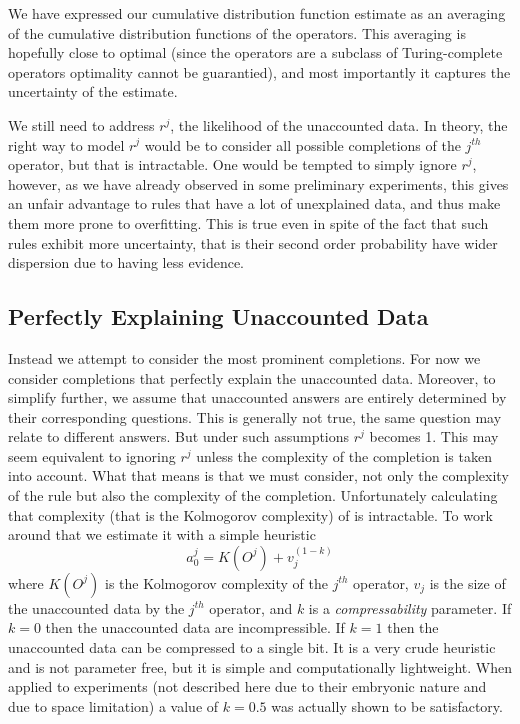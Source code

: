 \documentclass[runningheads]{llncs}
\begin{document}
We have expressed our cumulative distribution function estimate as an
averaging of the cumulative distribution functions of the
operators. This averaging is hopefully close to optimal (since the
operators are a subclass of Turing-complete operators optimality
cannot be guarantied), and most importantly it captures the
uncertainty of the estimate.

We still need to address $r^j$, the likelihood of the unaccounted
data. In theory, the right way to model $r^j$ would be to consider all
possible completions of the $j^{th}$ operator, but that is
intractable. One would be tempted to simply ignore $r^j$, however, as
we have already observed in some preliminary experiments, this gives
an unfair advantage to rules that have a lot of unexplained data, and
thus make them more prone to overfitting. This is true even in spite
of the fact that such rules exhibit more uncertainty, that is their
second order probability have wider dispersion due to having less
evidence.

\subsection{Perfectly Explaining Unaccounted Data}
Instead we attempt to consider the most prominent completions.  For
now we consider completions that perfectly explain the unaccounted
data. Moreover, to simplify further, we assume that unaccounted
answers are entirely determined by their corresponding questions. This
is generally not true, the same question may relate to different
answers. But under such assumptions $r^j$ becomes 1. This may seem
equivalent to ignoring $r^j$ unless the complexity of the completion
is taken into account. What that means is that we must consider, not
only the complexity of the rule but also the complexity of the
completion. Unfortunately calculating that complexity (that is the
Kolmogorov complexity) of is intractable. To work around that we
estimate it with a simple heuristic
\begin{equation}
a^j_0 = K(O^j) + v_j^{(1-k)}
\end{equation}
where $K(O^j)$ is the Kolmogorov complexity of the $j^{th}$ operator,
$v_j$ is the size of the unaccounted data by the $j^{th}$ operator,
and $k$ is a \emph{compressability} parameter. If $k=0$ then the
unaccounted data are incompressible. If $k=1$ then the unaccounted
data can be compressed to a single bit. It is a very crude heuristic
and is not parameter free, but it is simple and computationally
lightweight. When applied to experiments (not described here due to
their embryonic nature and due to space limitation) a value of $k=0.5$
was actually shown to be satisfactory.
\end{document}

